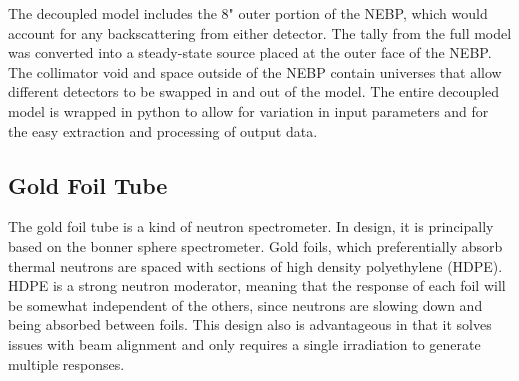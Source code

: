 The decoupled model includes the 8" outer portion of the NEBP, which would account for any backscattering from either detector.
The tally from the full model was converted into a steady-state source placed at the outer face of the NEBP.
The collimator void and space outside of the NEBP contain universes that allow different detectors to be swapped in and out of the model.
The entire decoupled model is wrapped in python to allow for variation in input parameters and for the easy extraction and processing of output data.


\subsection{Gold Foil Tube}

The gold foil tube is a kind of neutron spectrometer.
In design, it is principally based on the bonner sphere spectrometer.
Gold foils, which preferentially absorb thermal neutrons are spaced with sections of high density polyethylene (HDPE).
HDPE is a strong neutron moderator, meaning that the response of each foil will be somewhat independent of the others, since neutrons are slowing down and being absorbed between foils.
This design also is advantageous in that it solves issues with beam alignment and only requires a single irradiation to generate multiple responses.

%


